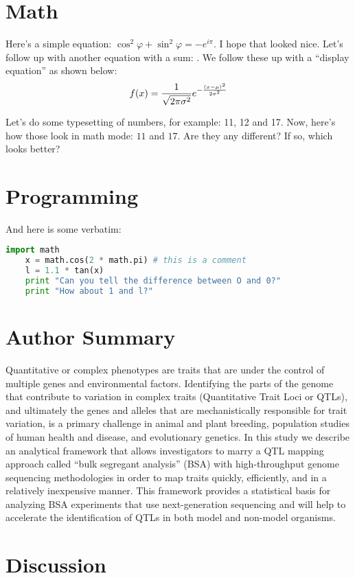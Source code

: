 \section{Math}

Here's a simple equation: $\cos^2 \varphi + \sin^2 \varphi = -e^{i\pi}$. I hope that looked nice. Let's follow up with another equation with a sum: \varx. We follow these up with a ``display equation'' as shown below:
\[
 f(x) = \frac{1}{\sqrt{2\pi\sigma^2}} e^{-\frac{(x-\mu)^2}{2\sigma^2}} 
\]

Let's do some typesetting of numbers, for example: 11, 12 and 17. Now, here's how those look in math mode: $11$ and $17$. Are they any different? If so, which looks better?

\section{Programming}

And here is some verbatim:

\begin{lstlisting}[language=Python]
    import math
    x = math.cos(2 * math.pi) # this is a comment
    l = 1.1 * tan(x)
    print "Can you tell the difference between O and 0?"
    print "How about 1 and l?"
\end{lstlisting}  


\section{Author Summary}
Quantitative or complex phenotypes are traits that are under the control of multiple genes and environmental factors.  Identifying the parts of the genome that contribute to variation in complex traits (Quantitative Trait Loci or QTLs), and ultimately the genes and alleles that are mechanistically responsible for trait variation, is a primary challenge in animal and plant breeding, population studies of human health and disease, and evolutionary genetics. In this study we describe an analytical framework that allows investigators to marry a QTL mapping approach called ``bulk segregant analysis'' (BSA) with high-throughput genome sequencing methodologies in order to map traits quickly, efficiently, and in a relatively inexpensive manner. This framework provides a statistical basis for analyzing BSA experiments that use next-generation sequencing and will help to accelerate the identification of QTLs in both model and non-model organisms.

\section{Discussion}


